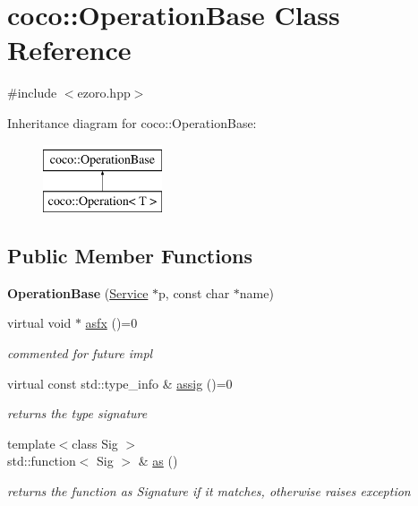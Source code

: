 \hypertarget{classcoco_1_1_operation_base}{\section{coco\-:\-:Operation\-Base Class Reference}
\label{classcoco_1_1_operation_base}
}


{\ttfamily \#include $<$ezoro.\-hpp$>$}

Inheritance diagram for coco\-:\-:Operation\-Base\-:\begin{figure}[H]
\begin{center}
\leavevmode
\includegraphics[height=2.000000cm]{classcoco_1_1_operation_base}
\end{center}
\end{figure}
\subsection*{Public Member Functions}
\begin{DoxyCompactItemize}
\item 
\hypertarget{classcoco_1_1_operation_base_ada81dd3d982b8b12a3692e5692470374}{{\bfseries Operation\-Base} (\hyperlink{classcoco_1_1_service}{Service} $\ast$p, const char $\ast$name)}\label{classcoco_1_1_operation_base_ada81dd3d982b8b12a3692e5692470374}

\item 
virtual void $\ast$ \hyperlink{classcoco_1_1_operation_base_a298735d41b5fa6f69ecbcec833e4127f}{asfx} ()=0
\begin{DoxyCompactList}\small\item\em commented for future impl \end{DoxyCompactList}\item 
\hypertarget{classcoco_1_1_operation_base_a858f1db28251468bba10f25b858851d7}{virtual const std\-::type\-\_\-info \& \hyperlink{classcoco_1_1_operation_base_a858f1db28251468bba10f25b858851d7}{assig} ()=0}\label{classcoco_1_1_operation_base_a858f1db28251468bba10f25b858851d7}

\begin{DoxyCompactList}\small\item\em returns the type signature \end{DoxyCompactList}\item 
\hypertarget{classcoco_1_1_operation_base_a3c71b11a14371ef3a160b49ff8b16dc9}{{\footnotesize template$<$class Sig $>$ }\\std\-::function$<$ Sig $>$ \& \hyperlink{classcoco_1_1_operation_base_a3c71b11a14371ef3a160b49ff8b16dc9}{as} ()}\label{classcoco_1_1_operation_base_a3c71b11a14371ef3a160b49ff8b16dc9}

\begin{DoxyCompactList}\small\item\em returns the function as Signature if it matches, otherwise raises exception \end{DoxyCompactList}\end{DoxyCompactItemize}

